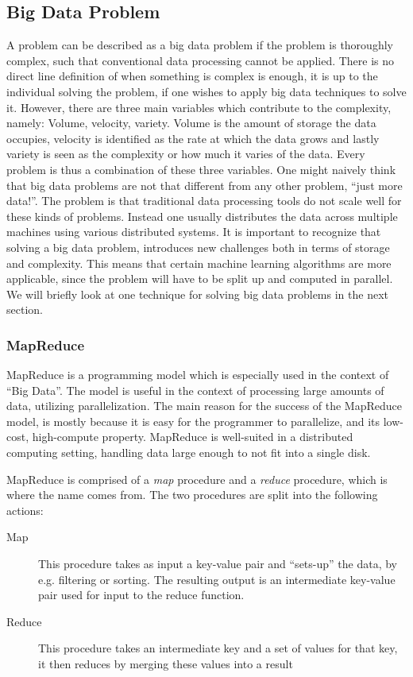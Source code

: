 \subsection{Big Data Problem}
A problem can be described as a big data problem if the problem is thoroughly complex, such that conventional data processing cannot be applied. There is no direct line definition of when something is complex is enough, it is up to the individual solving the problem, if one wishes to apply big data techniques to solve it. However, there are three main variables which contribute to the complexity, namely: Volume, velocity, variety. Volume is the amount of storage the data occupies, velocity is identified as the rate at which the data grows and lastly variety is seen as the complexity or how much it varies of the data. 
Every problem is thus a combination of these three variables. One might naively think that big data problems are not that different from any other problem, ``just more data!''. The problem is that traditional data processing tools do not scale well for these kinds of problems. Instead one usually distributes the data across multiple machines using various distributed systems. It is important to recognize that solving a big data problem, introduces new challenges both in terms of storage and complexity. This means that certain machine learning algorithms are more applicable, since the problem will have to be split up and computed in parallel. We will briefly look at one technique for solving big data problems in the next section.

\subsubsection{MapReduce} %
\label{sec:mapreduce_programming_model}

MapReduce is a programming model which is especially used in the context of ``Big Data''. The model is useful in the context of processing large amounts of data, utilizing parallelization. The main reason for the success of the MapReduce model, is mostly because it is easy for the programmer to parallelize, and its low-cost, high-compute property. MapReduce is well-suited in a distributed computing setting, handling data large enough to not fit into a single disk.

MapReduce is comprised of a \emph{map} procedure and a \emph{reduce} procedure, which is where the name comes from. The two procedures are split into the following actions:


\begin{description}
    \item[Map] This procedure takes as input a key-value pair and ``sets-up'' the data, by e.g. filtering or sorting. The resulting output is an intermediate key-value pair used for input to the reduce function.
    \item[Reduce] This procedure takes an intermediate key and a set of values for that key, it then reduces by merging these values into a result
\end{description}

